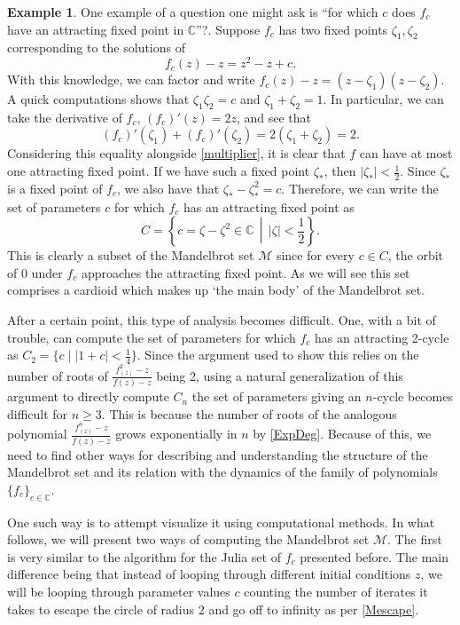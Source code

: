 \documentclass{amsart}
\newcommand{\bbC}{\mathbb{C}}
\newcommand{\cal}[1]{ \mathcal{#1}}
\newcommand{\Mand}{\cal{M}}
\newcommand{\abs}[1]{ \left| #1 \right| }
\theoremstyle{definition}
\newtheorem{exmp}[thm]{Example}
\theoremstyle{remark}
\numberwithin{equation}{section}
\begin{document}
\begin{exmp}\cite[Section 1.6.]{beardon2000}
  One example of a question one might ask is ``for which $c$ does $f_c$ have an attracting fixed point in $\bbC$''?. Suppose $f_c$ has two fixed points $\zeta_1, \zeta_2$ corresponding to the solutions of
  \[
f_c(z)-z=z^2-z+c.
  \]
  With this knowledge, we can factor and write $f_c(z)-z=(z-\zeta_1)(z-\zeta_2)$. A quick computations shows that  $\zeta_1\zeta_2=c$ and $\zeta_1+\zeta_2=1$. In particular, we can take the derivative of  $f_c$, $(f_c)'(z)=2z$, and see that \[
(f_c)'(\zeta_1)+(f_c)'(\zeta_2)= 2(\zeta_1+\zeta_2)=2.
  \]
Considering this equality alongside \cref{multiplier}, it is clear that $f$ can have at most one attracting fixed point. If we have such a fixed point $\zeta_\ast$, then $\abs{\zeta_\ast}<\frac{1}{2}$. Since $\zeta_\ast$ is a fixed point of $f_c$, we also have that $\zeta_\ast-\zeta^2_\ast=c$. Therefore, we can write the set of parameters $c$ for which $f_c$ has an attracting fixed point as
\[
C=\left\{c=\zeta-\zeta^2\in \bbC \,\middle\vert\,  \abs{\zeta}<\frac{1}{2}\right\}.
\]
This is clearly a subset of the Mandelbrot set $\Mand$ since for every $c\in C$, the orbit of 0 under $f_c$ approaches the attracting fixed point. As we will see this set comprises a cardioid which makes up `the main body' of the Mandelbrot set.
\end{exmp}

After a certain point, this type of analysis becomes difficult. One, with a bit of trouble, can compute the set of parameters for which $f_c$ has an attracting 2-cycle as $C_2=\{c\mid \abs{1+c}<\frac{1}{4} \}$. Since the argument used to show this relies on the number of roots of $\frac{f^2_(z)-z}{f(z)-z}$ being 2, using a natural generalization of this argument to directly compute $C_n$ the set of parameters giving an $n$-cycle becomes difficult for $n\geq 3$. This is because the number of roots of the analogous polynomial $\frac{f^n_(z)-z}{f(z)-z}$ grows exponentially in $n$ by \cref{ExpDeg}. Because of this, we need to find other ways for describing and understanding the structure of the Mandelbrot set and its relation with the dynamics of the family of polynomials $\{f_c\}_{c\in\bbC}$.

One such way is to attempt visualize it using computational methods. In what follows, we will present two ways of computing the Mandelbrot set $\Mand$. The first is very similar to the algorithm for the Julia set of $f_c$ presented before. The main difference being that instead of looping through different initial conditions $z$, we will be looping through parameter values $c$ counting the number of iterates it takes to escape the circle of radius $2$ and go off to infinity as per \cref{Mescape}.
\end{document}

